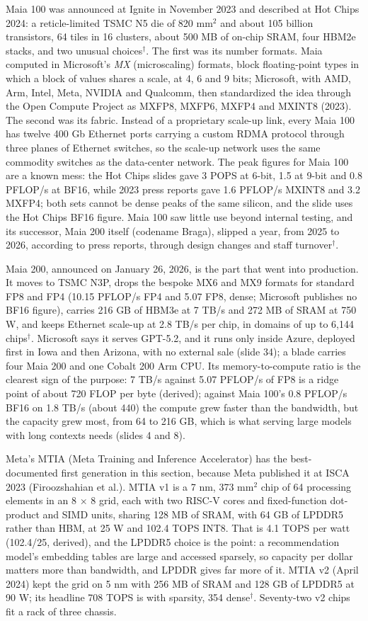 \documentclass[11pt,letterpaper]{article}
\begin{document}
Maia 100 was announced at Ignite in November 2023 and described at Hot Chips 2024: a reticle-limited TSMC N5 die of 820 mm$^2$ and about 105 billion transistors, 64 tiles in 16 clusters, about 500 MB of on-chip SRAM, four HBM2e stacks, and two unusual choices$^\dagger$. The first was its number formats. Maia computed in Microsoft's \emph{MX} (microscaling) formats, block floating-point types in which a block of values shares a scale, at 4, 6 and 9 bits; Microsoft, with AMD, Arm, Intel, Meta, NVIDIA and Qualcomm, then standardized the idea through the Open Compute Project as MXFP8, MXFP6, MXFP4 and MXINT8 (2023). The second was its fabric. Instead of a proprietary scale-up link, every Maia 100 has twelve 400 Gb Ethernet ports carrying a custom RDMA protocol through three planes of Ethernet switches, so the scale-up network uses the same commodity switches as the data-center network. The peak figures for Maia 100 are a known mess: the Hot Chips slides gave 3 POPS at 6-bit, 1.5 at 9-bit and 0.8 PFLOP/s at BF16, while 2023 press reports gave 1.6 PFLOP/s MXINT8 and 3.2 MXFP4; both sets cannot be dense peaks of the same silicon, and the slide uses the Hot Chips BF16 figure. Maia 100 saw little use beyond internal testing, and its successor, Maia 200 itself (codename Braga), slipped a year, from 2025 to 2026, according to press reports, through design changes and staff turnover$^\dagger$.

Maia 200, announced on January 26, 2026, is the part that went into production. It moves to TSMC N3P, drops the bespoke MX6 and MX9 formats for standard FP8 and FP4 (10.15 PFLOP/s FP4 and 5.07 FP8, dense; Microsoft publishes no BF16 figure), carries 216 GB of HBM3e at 7 TB/s and 272 MB of SRAM at 750 W, and keeps Ethernet scale-up at 2.8 TB/s per chip, in domains of up to 6{,}144 chips$^\dagger$. Microsoft says it serves GPT-5.2, and it runs only inside Azure, deployed first in Iowa and then Arizona, with no external sale (slide 34); a blade carries four Maia 200 and one Cobalt 200 Arm CPU. Its memory-to-compute ratio is the clearest sign of the purpose: 7 TB/s against 5.07 PFLOP/s of FP8 is a ridge point of about 720 FLOP per byte (derived); against Maia 100's 0.8 PFLOP/s BF16 on 1.8 TB/s (about 440) the compute grew faster than the bandwidth, but the capacity grew most, from 64 to 216 GB, which is what serving large models with long contexts needs (slides 4 and 8).

Meta's MTIA (Meta Training and Inference Accelerator) has the best-documented first generation in this section, because Meta published it at ISCA 2023 (Firoozshahian et al.). MTIA v1 is a 7 nm, 373 mm$^2$ chip of 64 processing elements in an 8 $\times$ 8 grid, each with two RISC-V cores and fixed-function dot-product and SIMD units, sharing 128 MB of SRAM, with 64 GB of LPDDR5 rather than HBM, at 25 W and 102.4 TOPS INT8. That is 4.1 TOPS per watt (102.4/25, derived), and the LPDDR5 choice is the point: a recommendation model's embedding tables are large and accessed sparsely, so capacity per dollar matters more than bandwidth, and LPDDR gives far more of it. MTIA v2 (April 2024) kept the grid on 5 nm with 256 MB of SRAM and 128 GB of LPDDR5 at 90 W; its headline 708 TOPS is with sparsity, 354 dense$^\dagger$. Seventy-two v2 chips fit a rack of three chassis.
\end{document}
